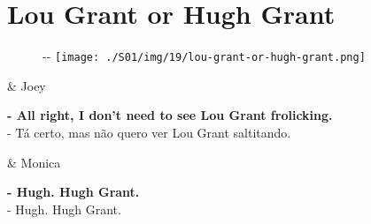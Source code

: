 \hypertarget{lou-grant-or-hugh-grant}{%
\section{Lou Grant or Hugh Grant}\label{lou-grant-or-hugh-grant}}

\begin{figure}[!ht]
  \begin{adjustwidth}{-\oddsidemargin-1in}{-\rightmargin}
    \centering
    \texttt{[image: ./S01/img/19/lou-grant-or-hugh-grant.png]}
  \end{adjustwidth}
\end{figure}

\begin{tcolorbox}[enhanced,center upper,
    drop fuzzy shadow southeast, boxrule=0.3pt,
    lower separated=false,
    colframe=black!30!dialogoBorder,colback=white]
\begin{minipage}[c]{0.16\linewidth}
   & \centering \scriptsize{Joey}
\end{minipage}
\hfill
\begin{minipage}[c]{0.8\linewidth}
  \textbf{- All right, I don't need to see Lou Grant frolicking.}\\
  - Tá certo, mas não quero ver Lou Grant saltitando.
\end{minipage}

\medskip
\begin{minipage}[c]{0.16\linewidth}
   & \centering \scriptsize{Monica}
\end{minipage}
\hfill
\begin{minipage}[c]{0.8\linewidth}
  \textbf{- Hugh. Hugh Grant.}\\
  - Hugh. Hugh Grant.
\end{minipage}
\end{tcolorbox}

